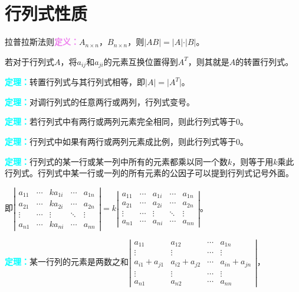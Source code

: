 \documentclass[UTF8, 12pt]{ctexart}
\begin{document}
\section{行列式性质}

拉普拉斯法则\textcolor{violet}{\textbf{定义：}}$A_{n\times n}$，$B_{n\times n}$，则$\vert AB\vert=\vert A\vert\cdot\vert B\vert$。

若对于行列式$A$，将$a_{ij}$和$a_{ji}$的元素互换位置得到$A^T$，则其就是$A$的转置行列式。

\textcolor{aqua}{\textbf{定理：}}转置行列式与其行列式相等，即$\vert A\vert=\vert A^T\vert$。

\textcolor{aqua}{\textbf{定理：}}对调行列式的任意两行或两列，行列式变号。

\textcolor{aqua}{\textbf{定理：}}若行列式中有两行或两列元素完全相同，则此行列式等于0。

\textcolor{aqua}{\textbf{定理：}}行列式中如果有两行或两列元素成比例，则此行列式等于0。

\textcolor{aqua}{\textbf{定理：}}行列式的某一行或某一列中所有的元素都乘以同一个数$k$，则等于用$k$乘此行列式。行列式中某一行或一列的所有元素的公因子可以提到行列式记号外面。

即$
\left|\begin{array}{ccccc}
a_{11} & \cdots & ka_{1i} & \cdots & a_{1n} \\
a_{21} & \cdots & ka_{2i} & \cdots & a_{2n} \\
\vdots & \cdots & \vdots & \ddots & \vdots \\
a_{n1} & \cdots & ka_{ni} & \cdots & a_{nn}
\end{array}\right|
=k\left|\begin{array}{ccccc}
a_{11} & \cdots & a_{1i} & \cdots & a_{1n} \\
a_{21} & \cdots & a_{2i} & \cdots & a_{2n} \\
\vdots & \cdots & \vdots & \ddots & \vdots \\
a_{n1} & \cdots & a_{ni} & \cdots & a_{nn}
\end{array}\right|$。

\textcolor{aqua}{\textbf{定理：}}某一行列的元素是两数之和$
\left|\begin{array}{cccc}
a_{11} & a_{12} & \cdots & a_{1n} \\
\vdots & \vdots & \cdots & \vdots \\
a_{i1}+a_{j1} & a_{i2}+a_{j2} & \cdots & a_{in}+a_{jn} \\
\vdots & \vdots & \cdots & \vdots \\
a_{n1} & a_{n2} & \cdots & a_{nn}
\end{array}\right|
$，
\end{document}
